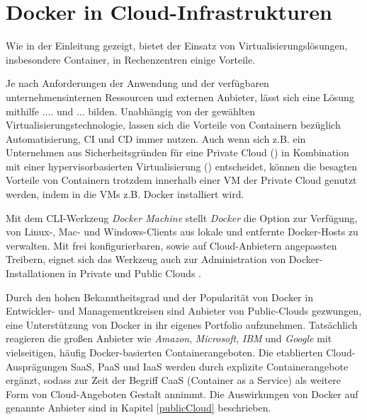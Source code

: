 \documentclass[../main.tex]{subfiles}
\begin{document}
\chapter{Docker in Cloud-Infrastrukturen}
\label{secInfrastructure}
  Wie in der Einleitung gezeigt, bietet der Einsatz von Virtualisierungslösungen, insbesondere Container, in Rechenzentren einige Vorteile.

  Je nach Anforderungen der Anwendung und der verfügbaren unternehmensinternen Ressourcen und externen Anbieter, lässt sich eine Lösung mithilfe \fig .... und \fig ... bilden. Unabhängig von der gewählten Virtualisierungstechnologie, lassen sich die Vorteile von Containern bezüglich Automatisierung, CI und CD immer nutzen. Auch wenn sich z.B. ein Unternehmen aus Sicherheitsgründen für eine Private Cloud () in Kombination mit einer hypervisorbasierten Virtualisierung () entscheidet, können die besagten Vorteile von Containern trotzdem innerhalb einer VM der Private Cloud genutzt werden, indem in die VMs z.B. Docker installiert wird.



  Mit dem CLI-Werkzeug \emph{Docker Machine} stellt \emph{Docker} die Option zur Verfügung, von Linux-, Mac- und Windows-Clients aus lokale und entfernte Docker-Hosts zu verwalten. Mit frei konfigurierbaren, sowie auf Cloud-Anbietern angepassten Treibern, eignet sich das Werkzeug auch zur Administration von Docker-Installationen in Private und Public Clouds \cite{dockerMachineOverview}\cite{dockerMachineDriverGeneric}\cite{dockerMachineOverviewCloud}.

  Durch den hohen Bekanntheitsgrad und der Popularität von Docker in Entwickler- und Managementkreisen sind Anbieter von Public-Clouds gezwungen, eine Unterstützung von Docker in ihr eigenes Portfolio aufzunehmen. Tatsächlich reagieren die großen Anbieter wie \emph{Amazon}, \emph{Microsoft}, \emph{IBM} und \emph{Google} mit vielseitigen, häufig Docker-basierten Containerangeboten. Die etablierten Cloud-Ausprägungen SaaS, PaaS und IaaS werden durch explizite Containerangebote ergänzt, sodass zur Zeit der Begriff CaaS (Container as a Service) als weitere Form von Cloud-Angeboten Gestalt annimmt. Die Auswirkungen von Docker auf genannte Anbieter sind in Kapitel \ref{publicCloud} beschrieben.
\end{document}
